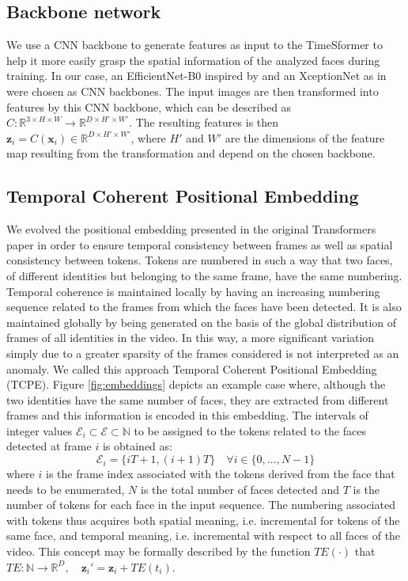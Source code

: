 \documentclass[10pt,twocolumn,letterpaper]{article}
\begin{document}
\subsection{Backbone network}
We use a CNN backbone to generate features as input to the TimeSformer to help it more easily grasp the spatial information of the analyzed faces during training. In our case, an EfficientNet-B0 inspired by \cite{10.1007/978-3-031-06433-3_19} and an XceptionNet as in \cite{10.1145/3549555.3549588} were chosen as CNN backbones. The input images are then transformed into features by this CNN backbone, which
can be described as $C:\mathbb{R}^{3 \times H \times W} \rightarrow \mathbb{R}^{D \times H' \times W'}$. The resulting features is then $\textbf{z}_i = C(\textbf{x}_i) \in \mathbb{R}^{D \times H' \times W'}$, where $H'$ and $W'$ are the dimensions of the feature map resulting from the transformation and depend on the chosen backbone.


\subsection{Temporal Coherent Positional Embedding}
We evolved the positional embedding presented in the original Transformers paper\cite{attentionisallyouneed} in order to ensure temporal consistency between frames as well as spatial consistency between tokens. Tokens are numbered in such a way that two faces, of different identities but belonging to the same frame, have the same numbering. Temporal coherence is maintained locally by having an increasing numbering sequence related to the frames from which the faces have been detected. It is also maintained globally by being generated on the basis of the global distribution of frames of all identities in the video. In this way, a more significant variation simply due to a greater sparsity of the frames considered is not interpreted as an anomaly. We called this approach Temporal Coherent Positional Embedding (TCPE).
Figure \ref{fig:embeddings} depicts an example case where, although the two identities have the same number of faces, they are extracted from different frames and this information is encoded in this embedding. The intervals of integer values $\mathcal{E}_i \subset \mathcal{E} \subset \mathbb{N}$ to be assigned to the tokens related to the faces detected at frame $i$ is obtained as: 
$$ \mathcal{E}_i = \{i  T + 1, (i+1) T\} \quad \forall i \in \{0,\ldots, N-1\} $$
where $i$ is the frame index associated with the tokens derived from the face that needs to be enumerated, $N$ is the total number of faces detected and $T$ is the number of tokens for each face in the input sequence.
The numbering associated with tokens thus acquires both spatial meaning, i.e. incremental for tokens of the same face, and temporal meaning, i.e. incremental with respect to all faces of the video. This concept may be formally described by the function $TE(\cdot)$ that $TE:\mathbb{N}\rightarrow\mathbb{R}^D,\quad \textbf{z}_i'=\textbf{z}_i+TE(t_i)$.
\end{document}
